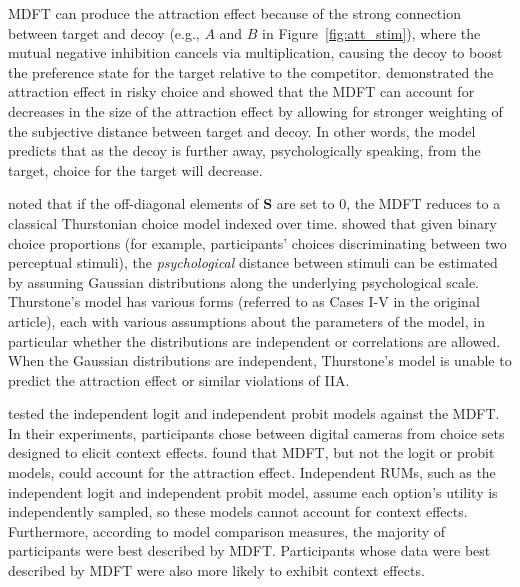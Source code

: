 MDFT can produce the attraction effect because of the strong connection between target and decoy (e.g., $A$ and $B$ in Figure~\ref{fig:att_stim}), where the mutual negative inhibition cancels via multiplication, causing the decoy to boost the preference state for the target relative to the competitor. \textcite{mohr2017attraction} demonstrated the attraction effect in risky choice and showed that the MDFT can account for decreases in the size of the attraction effect by allowing for stronger weighting of the subjective distance between target and decoy. In other words, the model predicts that as the decoy is further away, psychologically speaking, from the target, choice for the target will decrease.

\textcite{roeMultialternativeDecisionField2001a} noted that if the off-diagonal elements of $\boldsymbol{S}$ are set to $0$, the MDFT reduces to a classical Thurstonian choice model indexed over time. \textcite{thurstone1927law} showed that given binary choice proportions (for example, participants' choices discriminating between two perceptual stimuli), the \textit{psychological} distance between stimuli can be estimated by assuming Gaussian distributions along the underlying psychological scale. Thurstone's model has various forms (referred to as Cases I-V in the original article), each with various assumptions about the parameters of the model, in particular whether the distributions are independent or correlations are allowed. When the Gaussian distributions are independent, Thurstone's model is unable to predict the attraction effect or similar violations of IIA.

\textcite{berkowitschRigorouslyTestingMultialternative2014b} tested the independent logit and independent probit models against the MDFT. In their experiments, participants chose between digital cameras from choice sets designed to elicit context effects. \textcite{berkowitschRigorouslyTestingMultialternative2014b} found that MDFT, but not the logit or probit models, could account for the attraction effect. Independent RUMs, such as the independent logit and independent probit model, assume each option's utility is independently sampled, so these models cannot account for context effects. Furthermore, according to model comparison measures, the majority of participants were best described by MDFT. Participants whose data were best described by MDFT were also more likely to exhibit context effects. 

